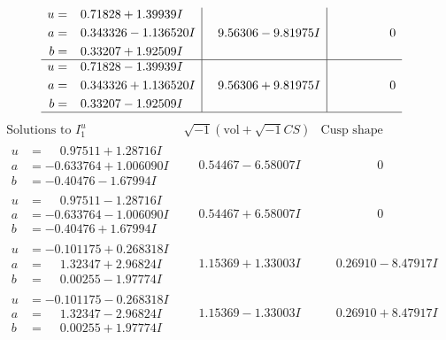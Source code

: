 \documentclass[1p]{elsarticle_modified}
\theoremstyle{definition}
\newcommand{\I}{\sqrt{-1}}
\begin{document}
$$\begin{array}{c|c|c}
\begin{aligned}
u &= \phantom{-}0.71828 + 1.39939 I \\
a &= \phantom{-}0.343326 - 1.136520 I \\
b &= \phantom{-}0.33207 + 1.92509 I\end{aligned}
 & \phantom{-}9.56306 - 9.81975 I & \phantom{-0.000000 } 0 \\ \hline\begin{aligned}
u &= \phantom{-}0.71828 - 1.39939 I \\
a &= \phantom{-}0.343326 + 1.136520 I \\
b &= \phantom{-}0.33207 - 1.92509 I\end{aligned}
 & \phantom{-}9.56306 + 9.81975 I & \phantom{-0.000000 } 0\\
 \hline 
 \end{array}$$\newpage$$\begin{array}{c|c|c}  
\text{Solutions to }I^u_{1}& \I (\text{vol} + \sqrt{-1}CS) & \text{Cusp shape}\\
 \hline 
\begin{aligned}
u &= \phantom{-}0.97511 + 1.28716 I \\
a &= -0.633764 + 1.006090 I \\
b &= -0.40476 - 1.67994 I\end{aligned}
 & \phantom{-}0.54467 - 6.58007 I & \phantom{-0.000000 } 0 \\ \hline\begin{aligned}
u &= \phantom{-}0.97511 - 1.28716 I \\
a &= -0.633764 - 1.006090 I \\
b &= -0.40476 + 1.67994 I\end{aligned}
 & \phantom{-}0.54467 + 6.58007 I & \phantom{-0.000000 } 0 \\ \hline\begin{aligned}
u &= -0.101175 + 0.268318 I \\
a &= \phantom{-}1.32347 + 2.96824 I \\
b &= \phantom{-}0.00255 - 1.97774 I\end{aligned}
 & \phantom{-}1.15369 + 1.33003 I & \phantom{-}0.26910 - 8.47917 I \\ \hline\begin{aligned}
u &= -0.101175 - 0.268318 I \\
a &= \phantom{-}1.32347 - 2.96824 I \\
b &= \phantom{-}0.00255 + 1.97774 I\end{aligned}
 & \phantom{-}1.15369 - 1.33003 I & \phantom{-}0.26910 + 8.47917 I \\ \hline\begin{aligned}

\end{aligned}
\end{array}$$
\end{document}

